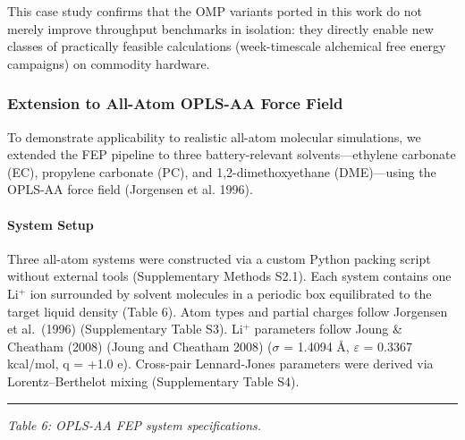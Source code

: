 \documentclass[
  11pt,
]{article}
\begin{document}
This case study confirms that the OMP variants ported in this work do
not merely improve throughput benchmarks in isolation: they directly
enable new classes of practically feasible calculations (week-timescale
alchemical free energy campaigns) on commodity hardware.

\subsubsection{Extension to All-Atom OPLS-AA Force
Field}\label{extension-to-all-atom-opls-aa-force-field}

To demonstrate applicability to realistic all-atom molecular
simulations, we extended the FEP pipeline to three battery-relevant
solvents---ethylene carbonate (EC), propylene carbonate (PC), and
1,2-dimethoxyethane (DME)---using the OPLS-AA force field (Jorgensen et
al. 1996).

\paragraph{System Setup}\label{system-setup-1}

Three all-atom systems were constructed via a custom Python packing
script without external tools (Supplementary Methods S2.1). Each system
contains one Li\(^{+}\) ion surrounded by solvent molecules in a
periodic box equilibrated to the target liquid density (Table 6). Atom
types and partial charges follow Jorgensen et al.~(1996) (Supplementary
Table S3). Li\(^{+}\) parameters follow Joung \& Cheatham (2008) (Joung
and Cheatham 2008) (\(\sigma\) = 1.4094 \AA{}, \(\varepsilon\) = 0.3367
kcal/mol, q = +1.0 e). Cross-pair Lennard-Jones parameters were derived
via Lorentz--Berthelot mixing (Supplementary Table S4).

\begin{center}\rule{0.5\linewidth}{0.5pt}\end{center}

\emph{Table 6: OPLS-AA FEP system specifications.}
\end{document}
